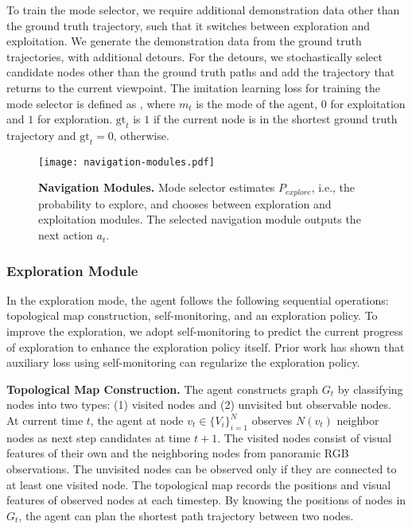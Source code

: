 \documentclass[10pt,twocolumn,letterpaper]{article}
\begin{document}
To train the mode selector, we require additional demonstration data
other than the ground truth trajectory, such that it switches between exploration and exploitation.
We generate the demonstration data from the ground truth trajectories, with additional detours.
For the detours, we stochastically select candidate nodes other than the ground truth paths
and add the trajectory that returns to the current viewpoint.
The imitation learning loss for training the mode selector is defined as ,
where $m_t$ is the mode of the agent, $0$ for exploitation and $1$ for exploration. $\text{gt}_t$ is $1$ if the current node is in the shortest ground truth trajectory and $\text{gt}_t=0$, otherwise.
\begin{figure}[t!]{\centering\texttt{[image: navigation-modules.pdf]}}\centering
\vspace{-0.3cm}
\caption{\protect\renewcommand{\baselinestretch}{0.9}\protect\small{\protect\textbf{Navigation Modules.} 
Mode selector estimates $P_{explore}$, i.e., the probability to explore, and chooses between exploration and exploitation modules. The selected navigation module outputs the next action $a_t$.
}}\label{fig:navigation-modules}\vspace{-0.7cm}
\end{figure}
\vspace{-0.3cm}

\subsubsection{Exploration Module}\label{sec:exploration-module}
\vspace{-0.2cm}
In the exploration mode, the agent follows the following sequential operations: topological map construction, self-monitoring, and an exploration policy. To improve the exploration, we adopt self-monitoring \cite{ma2019self} to predict the current progress of exploration to enhance the exploration policy itself. Prior work \cite{ma2019self, ma2019regretful} has shown that auxiliary loss using self-monitoring can regularize the exploration policy. \\
\vspace{-0.3cm}

\noindent\textbf{Topological Map Construction.}
The agent constructs graph $G_t$ by classifying nodes into two types: (1) visited nodes and (2) unvisited but observable nodes. At current time $t$, the agent at node $v_t \in \{V_i\}^N_{i=1}$ observes $N(v_t)$ neighbor nodes as next step candidates at time $t+1$. The visited nodes consist of visual features of their own and the neighboring nodes from panoramic RGB observations. The unvisited nodes can be observed only if they are connected to at least one visited node. The topological map records the positions and visual features of observed nodes at each timestep. By knowing the positions of nodes in $G_t$, the agent can plan the shortest path trajectory between two nodes.
\end{document}
